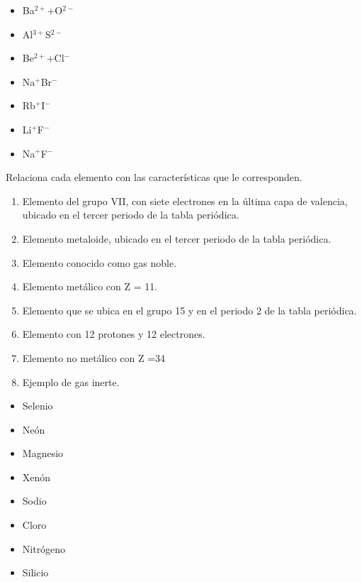 \begin{boxK}
\begin{minipage}{0.5\textwidth}
\begin{itemize}
            \item[\rule{1cm}{0.2mm}] Ba$^{2+}$+O$^{2-}$
            \item[\rule{1cm}{0.2mm}] Al$^{3+}$S$^{2-}$
            \item[\rule{1cm}{0.2mm}] Be$^{2+}$+Cl$^{-}$
            \item[\rule{1cm}{0.2mm}] Na$^+$Br$^-$
            \item[\rule{1cm}{0.2mm}] Rb$^+$I$^-$
            \item[\rule{1cm}{0.2mm}] Li$^+$F$^-$
            \item[\rule{1cm}{0.2mm}] Na$^+$F$^-$
        \end{itemize}
    \end{minipage}
\end{boxK}

\begin{boxK}
    Relaciona cada elemento con las características que le corresponden.

    \begin{minipage}{0.6\textwidth}
        \begin{enumerate}\footnotesize
            \item Elemento del grupo VII, con siete electrones en la última capa de valencia, ubicado en el tercer periodo de la tabla periódica.
            \item Elemento metaloide, ubicado en el tercer periodo de la tabla periódica.
            \item Elemento conocido como gas noble.
            \item Elemento metálico con Z = 11.
            \item Elemento que se ubica en el grupo 15 y en el periodo 2 de la tabla periódica.
            \item Elemento con 12 protones y 12 electrones.
            \item Elemento no metálico con Z =34
            \item Ejemplo de gas inerte.
        \end{enumerate}
    \end{minipage}\hfill
    \begin{minipage}{0.25\textwidth}
        \begin{itemize}
            \item[\rule{1cm}{0.2mm}] Selenio
            \item[\rule{1cm}{0.2mm}] Neón
            \item[\rule{1cm}{0.2mm}] Magnesio
            \item[\rule{1cm}{0.2mm}] Xenón
            \item[\rule{1cm}{0.2mm}] Sodio
            \item[\rule{1cm}{0.2mm}] Cloro
            \item[\rule{1cm}{0.2mm}] Nitrógeno
            \item[\rule{1cm}{0.2mm}] Silicio
        \end{itemize}
    \end{minipage}
\end{boxK}
